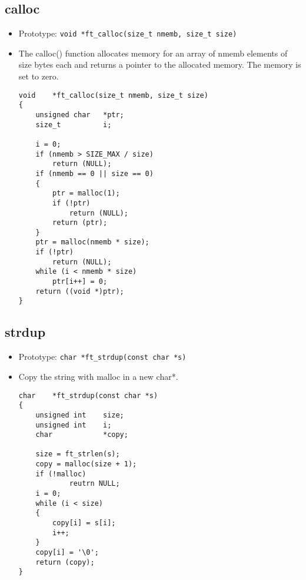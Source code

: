 \documentclass{article}
\begin{document}
	\subsection{calloc}
		\begin{itemize}[label=$\rightarrow$]
			\item Prototype: \texttt{void    *ft\_calloc(size\_t nmemb, size\_t size)}
			\item The calloc() function allocates memory for an array of  nmemb  elements of size bytes each and returns a pointer to the allocated memory. The memory is set to zero.
			\begin{verbatim}
void	*ft_calloc(size_t nmemb, size_t size)
{
	unsigned char	*ptr;
	size_t			i;

	i = 0;
	if (nmemb > SIZE_MAX / size)
		return (NULL);
	if (nmemb == 0 || size == 0)
	{
		ptr = malloc(1);
		if (!ptr)
			return (NULL);
		return (ptr);
	}
	ptr = malloc(nmemb * size);
	if (!ptr)
		return (NULL);
	while (i < nmemb * size)
		ptr[i++] = 0;
	return ((void *)ptr);
}

			\end{verbatim}
		\end{itemize}
	
	\subsection{strdup}
		\begin{itemize}[label=$\rightarrow$]
			\item Prototype: \texttt{char    *ft\_strdup(const char *s)}
			\item Copy the string with malloc in a new char*.
			\begin{verbatim}
char    *ft_strdup(const char *s)                                               
{                                                                               
    unsigned int    size;                                                       
    unsigned int    i;                                                          
    char            *copy;                                                      
                                                                                
    size = ft_strlen(s);                                                        
    copy = malloc(size + 1);                                                    
    if (!malloc)
    	    reutrn NULL;
    i = 0;                                                                      
    while (i < size)                                                            
    {                                                                           
        copy[i] = s[i];                                                         
        i++;                                                                    
    }                                                                           
    copy[i] = '\0';                                                             
    return (copy);                                                              
} 
			\end{verbatim}
		\end{itemize}
\end{document}
